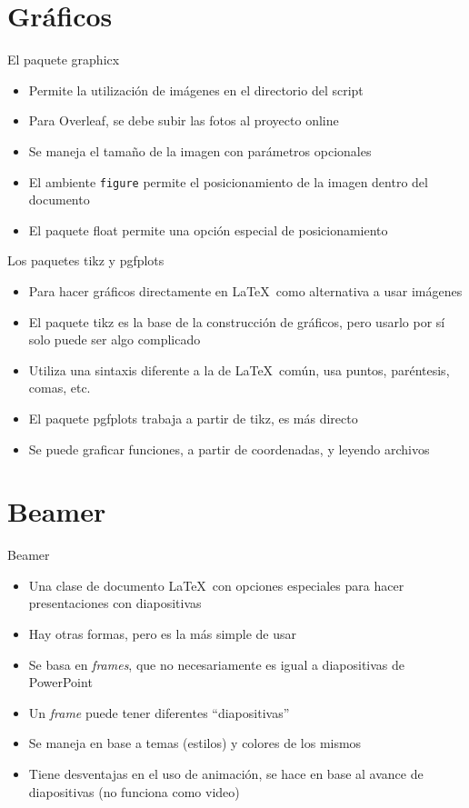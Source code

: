 \documentclass{beamer}
\begin{document}
 \section{Gráficos}
 \begin{frame}{El paquete \textsf{graphicx}}
 \begin{itemize}
     \item Permite la utilización de imágenes en el directorio del script
     \item Para Overleaf, se debe subir las fotos al proyecto online
     \item Se maneja el tamaño de la imagen con parámetros opcionales
    \item El ambiente \texttt{figure} permite el posicionamiento de la imagen dentro del documento
    \item El paquete \textsf{float} permite una opción especial de posicionamiento
     \end{itemize}
 
 \end{frame}
\begin{frame}{Los paquetes \textsf{tikz} y \textsf{pgfplots}}
\begin{itemize}
    \item Para hacer gráficos directamente en \LaTeX \, como alternativa a usar imágenes
    \item El paquete \textsf{tikz} es la base de la construcción de gráficos, pero usarlo por sí solo puede ser algo complicado
    \item Utiliza una sintaxis diferente a la de \LaTeX\ común, usa puntos, paréntesis, comas, etc. 
    \item El paquete \textsf{pgfplots} trabaja a partir de \textsf{tikz}, es más directo
    \item Se puede graficar funciones, a partir de coordenadas, y leyendo archivos 
\end{itemize}
    \end{frame}
\section{Beamer}
\begin{frame}{Beamer}
\begin{itemize}
    \item Una clase de documento \LaTeX \ con opciones especiales para hacer presentaciones con diapositivas
    \item Hay otras formas, pero es la más simple de usar
    \item Se basa en \textit{frames}, que no necesariamente es igual a diapositivas de PowerPoint
    \item Un \textit{frame} puede tener diferentes ``diapositivas''
    \item Se maneja en base a temas (estilos) y colores de los mismos
    \item Tiene desventajas en el uso de animación, se hace en base al avance de diapositivas (no funciona como video)
\end{itemize}
\end{frame}
\end{document}
